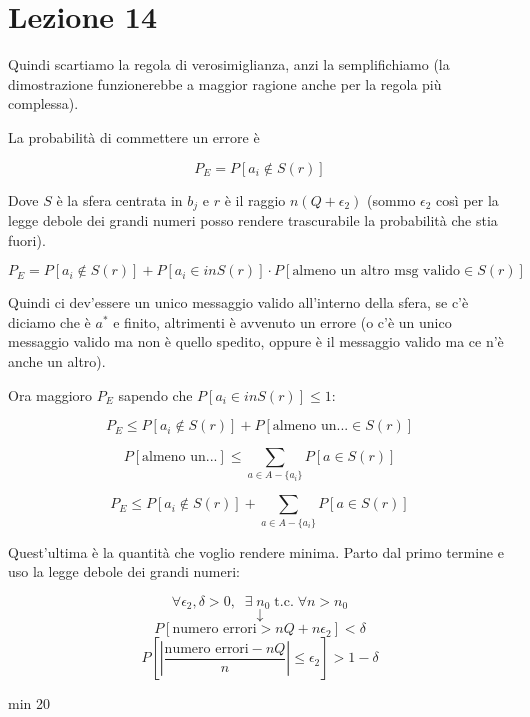 \section*{Lezione 14}

Quindi scartiamo la regola di verosimiglianza, anzi la semplifichiamo (la dimostrazione funzionerebbe a maggior ragione anche per la regola più complessa).

La probabilità di commettere un errore è

\begin{equation*}
P_E = P[a_i \notin S(r)]
\end{equation*}

Dove $S$ è la sfera centrata in $b_j$ e $r$ è il raggio $n(Q + \epsilon_2)$ (sommo $\epsilon_2$ così per la legge debole dei grandi numeri posso rendere trascurabile la probabilità che stia fuori).

\begin{equation*}
P_E = P[a_i \notin S(r)] + P[a_i \in in S(r)] \cdot P[\text{almeno un altro msg valido} \in S(r)]
\end{equation*}

Quindi ci dev'essere un unico messaggio valido all'interno della sfera, se c'è diciamo che è $a^*$ e finito, altrimenti è avvenuto un errore (o c'è un unico messaggio valido ma non è quello spedito, oppure è il messaggio valido ma ce n'è anche un altro).

Ora maggioro $P_E$ sapendo che $P[a_i \in in S(r)] \leq 1$:

\begin{equation*}
P_E \leq P[a_i \notin S(r)] + P[\text{almeno un...} \in S(r)]
\end{equation*}

\begin{equation*}
P[\text{almeno un...}] \leq \sum_{a \in A - \{a_i\}} P[a \in S(r)]
\end{equation*}

\begin{equation*}
P_E \leq P[a_i \notin S(r)] + \sum_{a \in A - \{a_i\}} P[a \in S(r)]
\end{equation*}

Quest'ultima è la quantità che voglio rendere minima.
Parto dal primo termine e uso la legge debole dei grandi numeri:

\begin{equation*}
\forall \epsilon_2, \delta > 0, \; \; \exists \; n_0 \; \text{t.c.} \; \forall n > n_0 
\end{equation*}
\begin{equation*}
\downarrow
\end{equation*}
\begin{equation*}
P[\text{numero errori} > nQ+n\epsilon_2] < \delta
\end{equation*}
\begin{equation*}
P[|\frac{\text{numero errori} - nQ}{n}| \leq \epsilon_2] > 1 - \delta
\end{equation*}

min 20